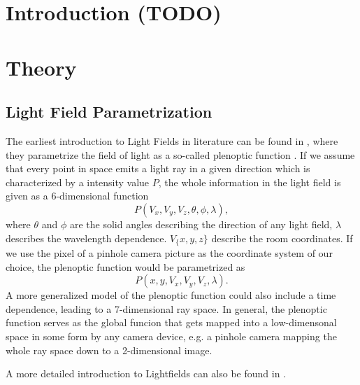 \documentclass  [
  paper    = a4,
  BCOR     = 10mm,
  twoside,
  fontsize = 12pt,
  fleqn,
  toc      = bibnumbered,
  toc      = listofnumbered,
  numbers  = noendperiod,
  headings = normal,
  listof   = leveldown,
  version  = 3.03
]                                       {scrreprt}
\begin{document}
  

  \tableofcontents


\chapter{Introduction (TODO)}
\chapter{Theory}
\section{Light Field Parametrization}
The earliest introduction to Light Fields in literature can be found in \cite{adelson1991plenoptic}, where they parametrize the field of light as a  so-called \glqq plenoptic function \grqq. If we assume that every point in space emits a light ray  in a given direction which is characterized by a intensity value $P$, the whole information in the light field is given as a 6-dimensional function
\begin{equation}\label{key}
P(V_x,V_y, V_z, \theta, \phi, \lambda),
\end{equation}
where $\theta$ and $\phi$ are the solid angles describing the direction of any light field, $\lambda$ describes the wavelength dependence. $V_\{x,y,z\}$ describe the room coordinates. If we use the pixel of a pinhole camera picture as the coordinate system of our choice, the plenoptic function would be parametrized as 
\begin{equation}\label{eq:plenoptic}
P(x,y, V_x, V_y, V_z, \lambda).
\end{equation}
 A more generalized model of the plenoptic function could also include a time dependence, leading to a 7-dimensional ray space. In general, the plenoptic function serves as the global funcion that gets mapped into a low-dimensonal space in some form by any camera device, e.g. a pinhole camera mapping the whole ray space down to a 2-dimensional image.\\
 	
 A more detailed introduction to Lightfields can also be found in \cite{wanner2014orientation}. 
\end{document}
